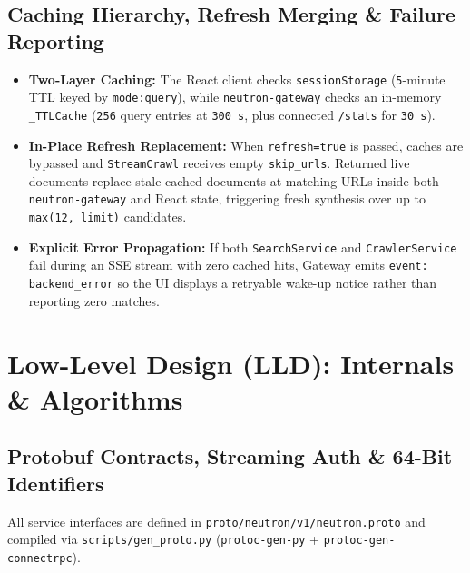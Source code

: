 \documentclass[10pt,a4paper]{article}
\begin{document}
\subsection{Caching Hierarchy, Refresh Merging \& Failure Reporting}
\begin{itemize}[leftmargin=1.4em, itemsep=2pt]
    \item \textbf{Two-Layer Caching:} The React client checks \texttt{sessionStorage} (\texttt{5}-minute TTL keyed by \texttt{mode:query}), while \texttt{neutron-gateway} checks an in-memory \texttt{\_TTLCache} (\texttt{256} query entries at \texttt{300\,s}, plus connected \texttt{/stats} for \texttt{30\,s}).
    \item \textbf{In-Place Refresh Replacement:} When \texttt{refresh=true} is passed, caches are bypassed and \texttt{StreamCrawl} receives empty \texttt{skip\_urls}. Returned live documents replace stale cached documents at matching URLs inside both \texttt{neutron-gateway} and React state, triggering fresh synthesis over up to \texttt{max(12, limit)} candidates.
    \item \textbf{Explicit Error Propagation:} If both \texttt{SearchService} and \texttt{CrawlerService} fail during an SSE stream with zero cached hits, Gateway emits \texttt{event: backend\_error} so the UI displays a retryable wake-up notice rather than reporting zero matches.
\end{itemize}

\clearpage
\section{Low-Level Design (LLD): Internals \& Algorithms}

\subsection{Protobuf Contracts, Streaming Auth \& 64-Bit Identifiers}
All service interfaces are defined in \texttt{proto/neutron/v1/neutron.proto} and compiled via \texttt{scripts/gen\_proto.py} (\texttt{protoc-gen-py} + \texttt{protoc-gen-connectrpc}).
\end{document}
